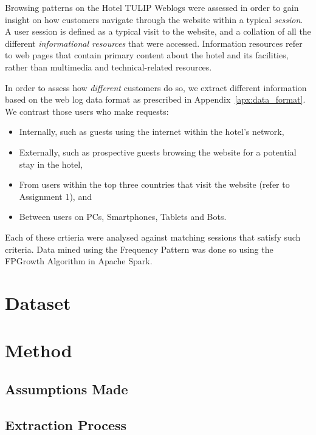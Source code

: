 \documentclass[12pt,titlepage]{article}
\begin{document}
Browsing patterns on the Hotel TULIP Weblogs were assessed in order to gain insight on how customers navigate through the website within a typical \textit{session}. A user session is defined as a typical visit to the website, and a collation of all the different \textit{informational resources} that were accessed. Information resources refer to web pages that contain primary content about the hotel and its facilities, rather than multimedia and technical-related resources.

In order to assess how \emph{different} customers do so, we extract different information based on the web log data format as prescribed in Appendix~\ref{apx:data_format}. We contrast those users who make requests:

\begin{itemize}
  \item Internally, such as guests using the internet within the hotel's network,
  \item Externally, such as prospective guests browsing the website for a potential stay in the hotel,
  \item From users within the top three countries that visit the  website (refer to Assignment 1), and
  \item Between users on PCs, Smartphones, Tablets and Bots.
\end{itemize}

Each of these crtieria were analysed against matching sessions that satisfy such criteria. Data mined using the Frequency Pattern was done so using the FPGrowth Algorithm in Apache Spark.

\section{Dataset}


\section{Method}
\label{sec:method}

\subsection{Assumptions Made}


\subsection{Extraction Process}
\end{document}
